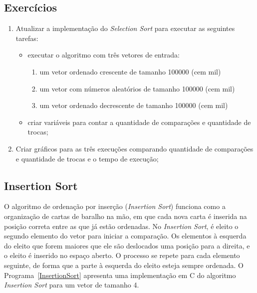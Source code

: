 \documentclass[11pt,fleqn]{book} %
\begin{document}
\subsection*{Exercícios}
\begin{enumerate}
	\item Atualizar a implementação do \textit{Selection Sort} para executar as seguintes tarefas:
	\begin{itemize}
		\item executar o algoritmo com três vetores de entrada:
		\begin{enumerate}
			\item um vetor ordenado crescente de tamanho 100000 (cem mil)
			\item um vetor com números aleatórios de tamanho 100000 (cem mil)
			\item um vetor ordenado decrescente de tamanho 100000 (cem mil)
		\end{enumerate} 
		\item criar variáveis para contar a quantidade de comparações e quantidade de trocas;
	\end{itemize} 
	\item Criar gráficos para as três execuções comparando quantidade de comparações e quantidade de trocas e o tempo de execução;
\end{enumerate} 
\newpage
\subsection*{Insertion Sort}
O algoritmo de ordenação por inserção (\textit{Insertion Sort}) funciona como a organização de cartas de baralho na mão, em que cada nova carta é inserida na posição correta entre as que já estão ordenadas.
No \textit{Insertion Sort}, é eleito o segundo elemento do vetor para iniciar a comparação.
Os elementos à esquerda do eleito que forem maiores que ele são deslocados uma posição para a direita, e o eleito é inserido no espaço aberto.
O processo se repete para cada elemento seguinte, de forma que a parte à esquerda do eleito esteja sempre ordenada.
O Programa~\ref{InsertionSort} apresenta uma implementação em C do algoritmo \textit{Insertion Sort} para um vetor de tamanho 4.

\end{document}
